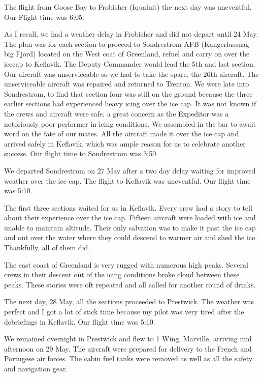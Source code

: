 The flight from Goose Bay to Frobisher (Iqualuit) the next day was
uneventful. Our Flight time was 6:05.

As I recall, we had a weather delay in Frobisher and did not depart
until 24 May. The plan was for each section to proceed to Sondrestrom
AFB (Kangerlussuag-big Fjord) located on the West coat of Greenland,
refuel and carry on over the icecap to Keflavik. The Deputy Commander
would lead the 5th and last section. Our aircraft was unserviceable so
we had to take the spare, the 26th aircraft. The unserviceable
aircraft was repaired and returned to Trenton. We were late into
Sondrestrom, to find that section four was still on the ground because
the three earlier sections had experienced heavy icing over the ice
cap.  It was not known if the crews and aircraft were safe, a great
concern as the Expeditor was a notoriously poor performer in icing
conditions. We assembled in the bar to await word on the fate of our
mates. All the aircraft made it over the ice cap and arrived safely in
Keflavik, which was ample reason for us to celebrate another
success. Our flight time to Sondrestrom was 3:50.

We departed Sondrestrom on 27 May after a two day delay waiting for
improved weather over the ice cap. The flight to Keflavik was
uneventful. Our flight time was 5:10.

The first three sections waited for us in Keflavik. Every crew had a
story to tell about their experience over the ice cap. Fifteen
aircraft were loaded with ice and unable to maintain altitude. Their
only salvation was to make it past the ice cap and out over the water
where they could descend to warmer air and shed the ice. Thankfully,
all of them did.

The east coast of Greenland is very rugged with numerous high
peaks. Several crews in their descent out of the icing conditions
broke cloud between these peaks. These stories were oft repeated and
all called for another round of drinks. 

The next day, 28 May, all the sections proceeded to Prestwick. The
weather was perfect and I got a lot of stick time because my pilot was
very tired after the debriefings in Keflavik. Our flight time was
5:10.

We remained overnight in Prestwick and flew to 1 Wing, Marville,
arriving mid afternoon on 29 May.  The aircraft were prepared for
delivery to the French and Portugese air forces. The cabin fuel tanks
were removed as well as all the safety and navigation gear.
 
